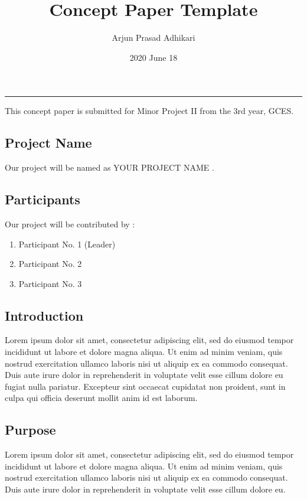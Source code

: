 \documentclass[a4paper, 12pt]{report}
\title{Concept Paper Template}
\author{Arjun Prasad Adhikari}
\date{2020 June 18}
\begin{document}
	\chapter*{}
	\hrule
	\vspace{2cm}
	
	This concept paper is submitted for Minor Project II from the 3rd year, GCES.
	\vspace{0.3cm}
	
	
	\section*{Project Name}
	Our project will be named as YOUR PROJECT NAME .
	\vspace{0.5cm}
	
	\section*{Participants}
	Our project will be contributed by :
	\begin{enumerate}
		\item Participant No. 1 (Leader)
		\item Participant No. 2
		\item Participant No. 3
	\end{enumerate}
	\vspace{0.5cm}


	\section*{Introduction}
	Lorem ipsum dolor sit amet, consectetur adipiscing elit, sed do eiusmod tempor incididunt ut labore et dolore magna aliqua. Ut enim ad minim veniam, quis nostrud exercitation ullamco laboris nisi ut aliquip ex ea commodo consequat. Duis aute irure dolor in reprehenderit in voluptate velit esse cillum dolore eu fugiat nulla pariatur. Excepteur sint occaecat cupidatat non proident, sunt in culpa qui officia deserunt mollit anim id est laborum.
	\vspace{0.5cm}
	
	
	\section*{Purpose}
	Lorem ipsum dolor sit amet, consectetur adipiscing elit, sed do eiusmod tempor incididunt ut labore et dolore magna aliqua. Ut enim ad minim veniam, quis nostrud exercitation ullamco laboris nisi ut aliquip ex ea commodo consequat. Duis aute irure dolor in reprehenderit in voluptate velit esse cillum dolore eu.
	\vspace{0.5cm}
	
\end{document}
